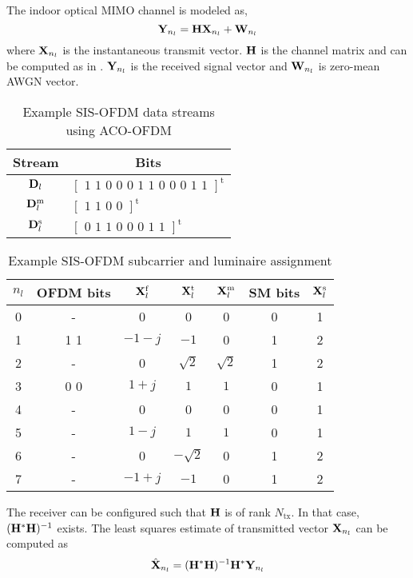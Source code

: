 The indoor optical MIMO channel is modeled as,
\begin{equation}
	\label{eqChannel}
	{\bf{Y}}_{n_l} = {\bf{H}}{\bf{X}}_{n_l} + {\bf{W}}_{n_l}
\end{equation}
where ${\bf{X}}_{n_l}$ is the instantaneous transmit vector. ${\bf{H}}$ is the channel matrix and can be computed as in \cite{but13a}. ${\bf{Y}}_{n_l}$ is the received signal vector and ${\bf{W}}_{n_l}$ is zero-mean AWGN vector.

\begin{table}[!t]
	\centering
		\begin{tabular}{|c|l|}
			\hline
			{\bf{Stream}}&\multicolumn{1}{|c|}{\bf{Bits}}\\
			\hline
			${\bf{D}}_l$ & $\left[\text{ 1 1 0 0 0 1 1 0 0 0 1 1 }\right]^{\text{t}} $\\
			\hline
			${\bf{D}}_l^{\text{m}}$ & $\left[\text{ 1 1 0 0 }\right]^{\text{t}} $\\
			\hline
			${\bf{D}}_l^{\text{s}}$ & $\left[\text{ 0 1 1 0 0 0 1 1 }\right]^{\text{t}} $\\
			\hline
		\end{tabular}
	\caption{Example SIS-OFDM data streams using ACO-OFDM}
	\label{tabExBits}
\end{table}
\begin{table}[!t]
	\centering
      \begin{tabular}{|c|c|c|c|c|c|c|}
			\hline
			{ $n_l$ }&{\bf{OFDM bits}}&${\bf{X}}_l^{\text{f}}$&${\bf{X}}^{\text{t}}_l$&${\bf{X}}^{\text{m}}_l$&{\bf{SM bits}}&${\bf{X}}^{\text{s}}_l$\\
			\hline
			0 & - & 0 & 0 & 0 &0 & 1\\
			\hline
			1 & 1 1 & $-1-j$ & $-1$ & 0 &1 & 2\\
			\hline
			2 & - & 0 & $\sqrt{2}$ & $\sqrt{2}$ &1 & 2\\
			\hline
			3 & 0 0 & $1+j$ & $1$ & $1$ & 0& 1\\
			\hline
			4 &-& 0 & 0 & 0 &0 & 1\\
			\hline
			5 &-& $1-j$ & $1$ & $1$ &0 & 1\\
			\hline
			6 &-& 0 & $-\sqrt{2}$ & 0 & 1& 2\\
			\hline
			7 &-& $-1+j$ & $-1$ & 0 &1 & 2\\
			\hline
		\end{tabular}
	\caption{Example SIS-OFDM subcarrier and luminaire assignment}
	\label{tabExample}
\end{table}

The receiver can be configured such that ${\bf{H}}$ is of rank $N_{\text{tx}}$. In that case, $({\bf{H}}^{*}{\bf{H}})^{-1}$ exists. The least squares estimate of transmitted vector ${\bf{X}}_{n_l}$ can be computed as
\begin{equation}
	\label{eqXls}
	\hat{{\bf{X}}}_{n_l} = ({\bf{H}}^{*}{\bf{H}})^{-1}{\bf{H}}^{*}{\bf{Y}}_{n_l}
\end{equation}

